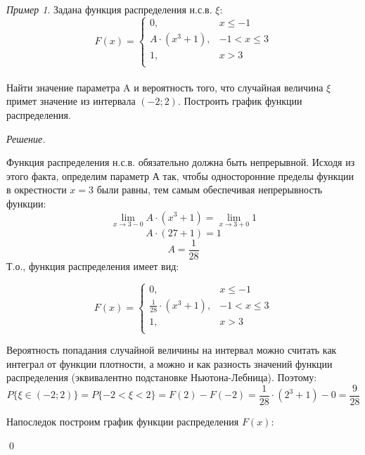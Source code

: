 \documentclass[12pt,a4paper]{article}
\theoremstyle{definition}
\theoremstyle{definition}
\theoremstyle{remark}
\theoremstyle{corollary}
\theoremstyle{bolditalic}
\newtheorem{example}{Пример}[section]
\newenvironment{solution}{
    \vspace{0.5em}
    \noindent\textit{Решение.}
}{\qed\vspace{1em}}
\begin{document}
\begin{example}
    Задана функция распределения н.с.в. $\xi$:\\
    
    \[
    F(x) = \begin{cases}
      0, & x \le -1 \\
      A\cdot(x^3+1), & -1 < x \le 3 \\
      1, & x > 3 \\
    \end{cases}
    \]
    \\
    Найти значение параметра A и вероятность того, что случайная величина $\xi$ примет значение из интервала $(-2;2)$. Построить график функции распределения.
\end{example}
\begin{solution}
    Функция распределения н.с.в. обязательно должна быть непрерывной. Исходя из этого факта, определим параметр А так, чтобы односторонние пределы функции в окрестности $x=3$ были равны, тем самым обеспечивая непрерывность функции:
    \[
    \lim_{x\rightarrow3-0}{A\cdot(x^3+1)} = \lim_{x\rightarrow3+0}{1}
    \]
    \[
    A\cdot (27 + 1)=1
    \]
    \[
    A = \frac{1}{28}
    \]
    Т.о., функция распределения имеет вид:

    \[
    F(x) = \begin{cases}
      0, & x \le -1 \\
      \frac{1}{28}\cdot(x^3+1), & -1 < x \le 3 \\
      1, & x > 3 \\
    \end{cases}
    \]
    
    Вероятность попадания случайной величины на интервал можно считать как интеграл от функции плотности, а можно и как разность значений функции распределения (эквивалентно подстановке Ньютона-Лебница). Поэтому:
    \[
    P\{\xi\in(-2;2)\}=P\{-2<\xi<2\}=F(2)-F(-2)=\frac{1}{28}\cdot(2^3+1)-0=\frac{9}{28}
    \]

    Напоследок построим график функции распределения $F(x)$:

\end{solution}
\end{document}
